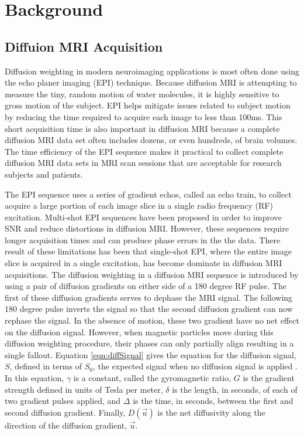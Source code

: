 \chapter{Background}
\section{Diffuion MRI Acquisition}
	Diffusion weighting in modern neuroimaging applications is most often done using the echo planer imaging (EPI) technique\cite{Poustchi_Amin_2001, Ordidge_1984}. Because diffusion MRI is attempting to measure the tiny, random motion of water molecules, it is highly sensitive to gross motion of the subject. EPI helps mitigate issues related to subject motion by reducing the time required to acquire each image to less than 100ms. This short acquisition time is also important in diffusion MRI because a complete diffusion MRI data set often includes dozens, or even hundreds, of brain volumes. The time efficiency of the EPI sequence makes it practical to collect complete diffusion MRI data sets in MRI scan sessions that are acceptable for research subjects and patients.
	
    The EPI sequence uses a series of gradient echos, called an echo train, to collect acquire a large portion of each image slice in a single radio frequency (RF) excitation. Multi-shot EPI sequences have been proposed in order to improve SNR and reduce distortions in diffusion MRI. However, these sequences require longer acquisition times and can produce phase errors in the the data\cite{Feinberg_1994}. There result of these limitations has been that single-shot EPI, where the entire image slice is acquired in a single excitation, has become dominate in diffusion MRI acquisitions. The diffusion weighting in a diffusion MRI sequence is introduced by using a pair of diffusion gradients on either side of a 180 degree RF pulse. The first of these diffusion gradients serves to dephase the MRI signal. The following 180 degree pulse inverts the signal so that the second diffusion gradient can now rephase the signal. In the absence of motion, these two gradient have no net effect on the diffusion signal. However, when magnetic particles move during this diffusion weighting procedure, their phases can only partially align resulting in a single fallout. Equation \ref{eqn:diffSignal} gives the equation for the diffusion signal, $S$, defined in terms of $S_0$, the expected signal when no diffusion signal is applied \cite{2014}. In this equation, $\gamma$ is a constant, called the gyromagnetic ratio, $G$ is the gradient strength defined in units of Tesla per meter, $\delta$ is the length, in seconds, of each of two gradient pulses applied, and $\Delta$ is the time, in seconds, between the first and second diffusion gradient. Finally, $D(\vec{u})$ is the net diffusivity along the direction of the diffusion gradient, $\vec{u}$.


